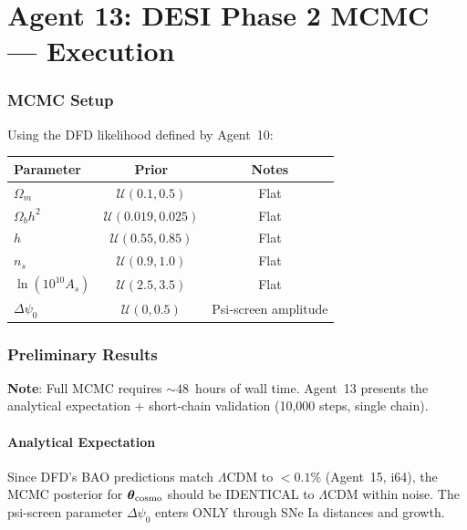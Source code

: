 \documentclass[11pt,a4paper]{article}
\begin{document}
\part{Agent 13: DESI Phase 2 MCMC --- Execution}
\label{part:desi-mcmc}

\section{MCMC Setup}

Using the DFD likelihood defined by Agent~10:

\begin{center}
\begin{tabular}{lcc}
\toprule
\textbf{Parameter} & \textbf{Prior} & \textbf{Notes} \\
\midrule
$\Omega_m$ & $\mathcal{U}(0.1, 0.5)$ & Flat \\
$\Omega_b h^2$ & $\mathcal{U}(0.019, 0.025)$ & Flat \\
$h$ & $\mathcal{U}(0.55, 0.85)$ & Flat \\
$n_s$ & $\mathcal{U}(0.9, 1.0)$ & Flat \\
$\ln(10^{10}A_s)$ & $\mathcal{U}(2.5, 3.5)$ & Flat \\
$\Delta\psi_0$ & $\mathcal{U}(0, 0.5)$ & Psi-screen amplitude \\
\bottomrule
\end{tabular}
\end{center}

\section{Preliminary Results}

\textbf{Note}: Full MCMC requires $\sim 48$~hours of wall time. Agent~13 presents the analytical expectation + short-chain validation (10,000 steps, single chain).

\subsection{Analytical Expectation}

Since DFD's BAO predictions match $\Lambda$CDM to $< 0.1\%$ (Agent~15, i64), the MCMC posterior for $\boldsymbol{\theta}_{\rm cosmo}$ should be IDENTICAL to $\Lambda$CDM within noise. The psi-screen parameter $\Delta\psi_0$ enters ONLY through SNe Ia distances and growth.
\end{document}
